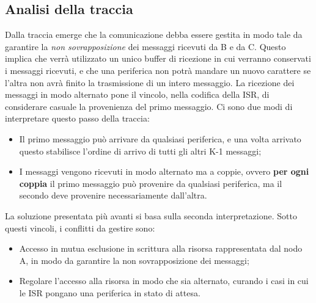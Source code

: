 \documentclass{article}
\begin{document}

\subsection{Analisi della traccia}
Dalla traccia emerge che la comunicazione debba essere gestita in modo tale da garantire la \textit{non sovrapposizione} dei messaggi ricevuti da B e da C. Questo implica che verrà utilizzato un unico buffer di ricezione in cui verranno conservati i messaggi ricevuti, e che una periferica non potrà mandare un nuovo carattere se l'altra non avrà finito la trasmissione di un intero messaggio. La ricezione dei messaggi in modo alternato pone il vincolo, nella codifica della ISR, di considerare casuale la provenienza del primo messaggio. Ci sono due modi di interpretare questo passo della traccia:
\begin{itemize}
	\item Il primo messaggio può arrivare da qualsiasi periferica, e una volta arrivato questo stabilisce l'ordine di arrivo di tutti gli altri K-1 messaggi;
	\item I messaggi vengono ricevuti in modo alternato ma a coppie, ovvero \textbf{per ogni coppia} il primo messaggio può provenire da qualsiasi periferica, ma il secondo deve provenire necessariamente dall'altra.
\end{itemize}
La soluzione presentata più avanti si basa sulla seconda interpretazione. Sotto questi vincoli, i conflitti da gestire sono:
\begin{itemize}
	\item Accesso in mutua esclusione in scrittura alla risorsa rappresentata dal nodo A, in modo da garantire la non sovrapposizione dei messaggi;
	\item Regolare l'accesso alla risorsa in modo che sia alternato, curando i casi in cui le ISR pongano una periferica in stato di attesa. 
\end{itemize}


	
\end{document}
